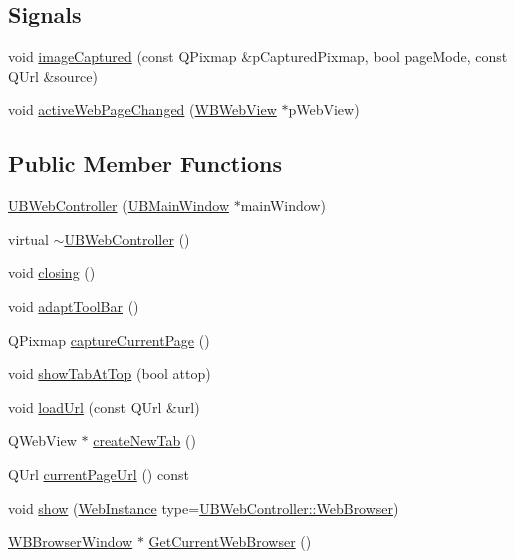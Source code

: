 \subsection*{Signals}
\begin{DoxyCompactItemize}
\item 
void \hyperlink{class_u_b_web_controller_a1dfa1e722317d32d6d773f645469533b}{image\-Captured} (const Q\-Pixmap \&p\-Captured\-Pixmap, bool page\-Mode, const Q\-Url \&source)
\item 
void \hyperlink{class_u_b_web_controller_a283583c27a1e5495ebe9e4df2fbe7dfa}{active\-Web\-Page\-Changed} (\hyperlink{class_w_b_web_view}{W\-B\-Web\-View} $\ast$p\-Web\-View)
\end{DoxyCompactItemize}
\subsection*{Public Member Functions}
\begin{DoxyCompactItemize}
\item 
\hyperlink{class_u_b_web_controller_ad520d21522662fba52976d79aaff4cfd}{U\-B\-Web\-Controller} (\hyperlink{class_u_b_main_window}{U\-B\-Main\-Window} $\ast$main\-Window)
\item 
virtual \hyperlink{class_u_b_web_controller_af7bd48868512da9f0e7a47f3ef4f6a3a}{$\sim$\-U\-B\-Web\-Controller} ()
\item 
void \hyperlink{class_u_b_web_controller_a7a1b738035d4abfe600f56133f2cd39f}{closing} ()
\item 
void \hyperlink{class_u_b_web_controller_a8b04641f066be7c1aded39c4fce340ec}{adapt\-Tool\-Bar} ()
\item 
Q\-Pixmap \hyperlink{class_u_b_web_controller_a0c8e5de1ef638ae4b222e54313546c22}{capture\-Current\-Page} ()
\item 
void \hyperlink{class_u_b_web_controller_adaf3fab36923c91db37848a68eb0f1ac}{show\-Tab\-At\-Top} (bool attop)
\item 
void \hyperlink{class_u_b_web_controller_a9386961472ce9dd1126326045728ebe4}{load\-Url} (const Q\-Url \&url)
\item 
Q\-Web\-View $\ast$ \hyperlink{class_u_b_web_controller_af9046b76487c859cf038ac36457040a3}{create\-New\-Tab} ()
\item 
Q\-Url \hyperlink{class_u_b_web_controller_a55f7aeb595be5fde2834c3f64f55a51a}{current\-Page\-Url} () const 
\item 
void \hyperlink{class_u_b_web_controller_a87190d333dad802b898be56bce95b539}{show} (\hyperlink{class_u_b_web_controller_a39111fb6c022df143222a82026175f7e}{Web\-Instance} type=\hyperlink{class_u_b_web_controller_a39111fb6c022df143222a82026175f7ea373ad368e9c8f796c07a81a886ae227a}{U\-B\-Web\-Controller\-::\-Web\-Browser})
\item 
\hyperlink{class_w_b_browser_window}{W\-B\-Browser\-Window} $\ast$ \hyperlink{class_u_b_web_controller_aab1a2de37e555de61073ba5775d0fdef}{Get\-Current\-Web\-Browser} ()
\end{DoxyCompactItemize}
